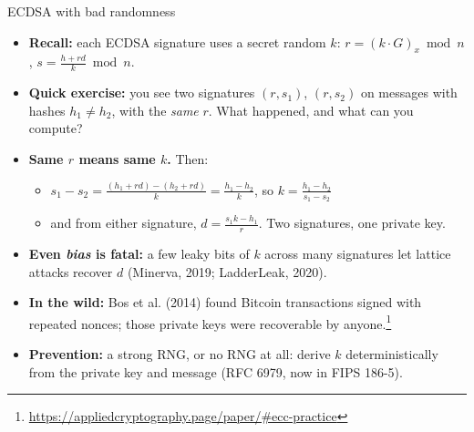 \ifdefined\PRESENTATION\else\PassOptionsToClass{handout}{beamer}\fi\documentclass[aspectratio=169, lualatex]{beamer}
\begin{document}
\begin{frame}{ECDSA with bad randomness}
	\begin{itemize}
		\item \textbf{Recall:} each ECDSA signature uses a secret random $k$: $r = (k \cdot G)_x \bmod n$, \quad $s = \frac{h + rd}{k} \bmod n$.
		\item \textbf{Quick exercise:} you see two signatures $(r, s_1)$, $(r, s_2)$ on messages with hashes $h_1 \neq h_2$, with the \emph{same} $r$. What happened, and what can you compute?
	\end{itemize}
	\begin{itemize}[<+->]
		\item \textbf{Same $r$ means same $k$.} Then:
		      \begin{itemize}
			      \item $s_1 - s_2 = \frac{(h_1 + rd) - (h_2 + rd)}{k} = \frac{h_1 - h_2}{k}$, so $k = \frac{h_1 - h_2}{s_1 - s_2}$
			      \item and from either signature, $d = \frac{s_1 k - h_1}{r}$. Two signatures, one private key.
		      \end{itemize}
		\item \textbf{Even \emph{bias} is fatal:} a few leaky bits of $k$ across many signatures let lattice attacks recover $d$ (Minerva, 2019; LadderLeak, 2020).
		\item \textbf{In the wild:} Bos et al. (2014) found Bitcoin transactions signed with repeated nonces; those private keys were recoverable by anyone.\footnote{\url{https://appliedcryptography.page/paper/\#ecc-practice}}
		\item \textbf{Prevention:} a strong RNG, or no RNG at all: derive $k$ deterministically from the private key and message (RFC 6979, now in FIPS 186-5).
	\end{itemize}
\end{frame}
\end{document}
